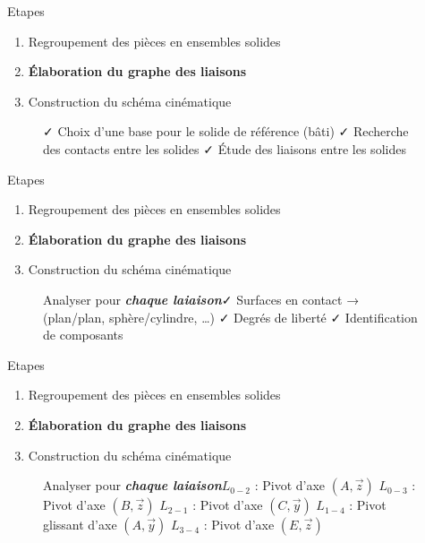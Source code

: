 \documentclass[
  ignorenonframetext,
  aspectratio=169,
  c]{beamer}
\providecommand{\tightlist}{%
  \setlength{\itemsep}{0pt}\setlength{\parskip}{0pt}}\usepackage{longtable,booktabs,array}
\begin{document}
\begin{frame}{Etapes}
\label{etapes-10}
\begin{enumerate}
\tightlist
\item
  {Regroupement des pièces en ensembles solides}
\item
  \textbf{Élaboration du graphe des liaisons}
\item
  {Construction du schéma cinématique}
\end{enumerate}

\begin{figure}

\begin{minipage}{0.70\linewidth}
✓ Choix d'une base pour le solide de référence (bâti) ✓ Recherche des
contacts entre les solides ✓ Étude des liaisons entre les
solides\end{minipage}%

\end{figure}%
\end{frame}

\begin{frame}{Etapes}
\label{etapes-11}
\begin{enumerate}
\tightlist
\item
  {Regroupement des pièces en ensembles solides}
\item
  \textbf{Élaboration du graphe des liaisons}
\item
  {Construction du schéma cinématique}
\end{enumerate}

\begin{figure}

\begin{minipage}{0.80\linewidth}
Analyser pour \textbf{\emph{chaque laiaison}}✓ Surfaces en contact →
(plan/plan, sphère/cylindre, \ldots) ✓ Degrés de liberté ✓
Identification de composants\end{minipage}%

\end{figure}%
\end{frame}

\begin{frame}{Etapes}
\label{etapes-12}
\begin{enumerate}
\tightlist
\item
  {Regroupement des pièces en ensembles solides}
\item
  \textbf{Élaboration du graphe des liaisons}
\item
  {Construction du schéma cinématique}
\end{enumerate}

\begin{figure}

\begin{minipage}{0.80\linewidth}
Analyser pour \textbf{\emph{chaque laiaison}}\(L_{0-2}\) : Pivot d'axe
\((𝐴,\vec{z})\) \(L_{0-3}\) : Pivot d'axe \((𝐵,\vec{z})\) \(L_{2-1}\) :
Pivot d'axe \((𝐶,\vec{y})\) \(L_{1-4}\) : Pivot glissant d'axe
\((𝐴,\vec{y})\) \(L_{3-4}\) : Pivot d'axe \((E,\vec{z})\)\end{minipage}%

\end{figure}%
\end{frame}
\end{document}
